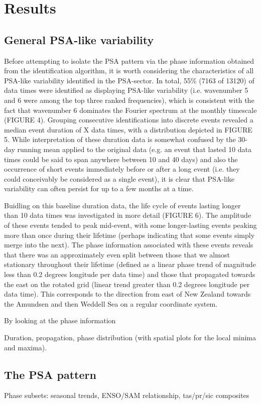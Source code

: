 \section{Results}

\subsection{General PSA-like variability}

Before attempting to isolate the PSA pattern via the phase information obtained from the identification algorithm, it is worth considering the characteristics of all PSA-like variability identified in the PSA-sector. In total, 55\% (7163 of 13120) of data times were identified as displaying PSA-like variability (i.e. wavenumber 5 and 6 were among the top three ranked frequencies), which is consistent with the fact that wavenumber 6 dominates the Fourier spectrum at the monthly timescale (FIGURE 4). Grouping consecutive identifications into discrete events revealed a median event duration of X data times, with a distribution depicted in FIGURE 5. While interpretation of these duration data is somewhat confused by the 30-day running mean applied to the original data (e.g. an event that lasted 10 data times could be said to span anywhere between 10 and 40 days) and also the occurrence of short events immediately before or after a long event (i.e. they could conceivably be considered as a single event), it is clear that PSA-like variability can often persist for up to a few months at a time.     

Buidling on this baseline duration data, the life cycle of events lasting longer than 10 data times was investigated in more detail (FIGURE 6). The amplitude of these events tended to peak mid-event, with some longer-lasting events peaking more than once during their lifetime (perhaps indicating that some events simply merge into the next). The phase information associated with these events reveals that there was an approximately even split between those that we almost stationary throughout their lifetime (defined as a linear phase trend of magnitude less than 0.2 degrees longitude per data time) and those that propagated towards the east on the rotated grid (linear trend greater than 0.2 degrees longitude per data time). This corresponds to the direction from east of New Zealand towards the Amundsen and then Weddell Sea on a regular coordinate system. 

By looking at the phase information 


Duration, propagation, phase distribution (with spatial plots for the local minima and maxima).

\subsection{The PSA pattern}

Phase subsets: seasonal trends, ENSO/SAM relationship, tas/pr/sic composites







